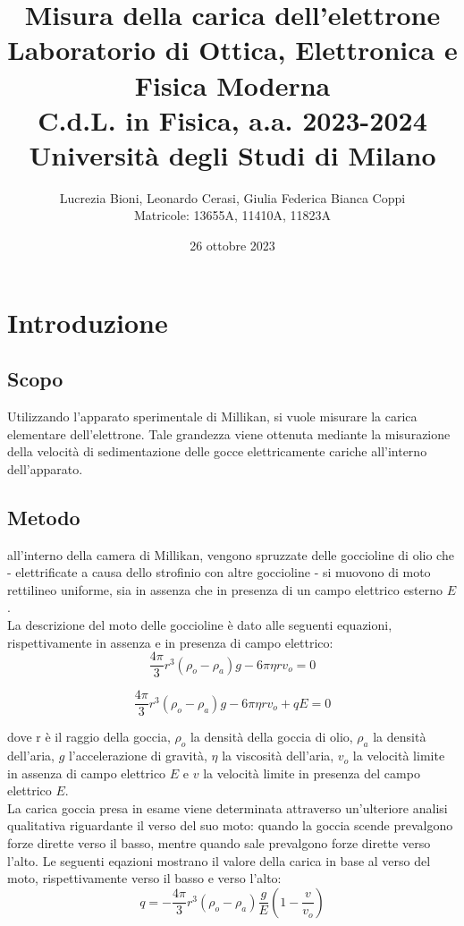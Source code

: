 \documentclass[]{article}
\title{%
    \Huge Misura della carica dell'elettrone \\
    \Large Laboratorio di Ottica, Elettronica e Fisica Moderna \\ C.d.L. in Fisica, a.a. 2023-2024 \\ Università degli Studi di Milano}
\author{\LARGE Lucrezia Bioni, Leonardo Cerasi, Giulia Federica Bianca Coppi \\ Matricole: 13655A, 11410A, 11823A}
\date{26 ottobre 2023}
\let\oldsection\section%
\renewcommand{\section}{%
	\renewcommand{\theequation}{\thesection.\arabic{equation}}%
	\oldsection}%
\let\oldsubsection\subsection%
\renewcommand{\subsection}{%
	\renewcommand{\theequation}{\thesubsection.\arabic{equation}}%
	\oldsubsection}%
\begin{document}
    \maketitle

    \section{Introduzione}
    \subsection{Scopo}
    Utilizzando l'apparato sperimentale di Millikan, si vuole misurare la carica elementare dell'elettrone. Tale grandezza viene ottenuta mediante la misurazione della velocità di sedimentazione delle gocce elettricamente cariche all'interno dell'apparato.

    \subsection{Metodo}
    all'interno della camera di Millikan, vengono spruzzate delle goccioline di olio che - elettrificate a causa dello strofinio con altre goccioline - si muovono di moto rettilineo uniforme, sia in assenza che in presenza di un campo elettrico esterno $E$. \\ La descrizione del moto delle goccioline è dato alle seguenti equazioni, rispettivamente in assenza e in presenza di campo elettrico: 
    \begin{equation}
        \label{moto1}
        \frac{4 \pi}{3} r^3 (\rho_o - \rho_a) g - 6 \pi \eta r v_o = 0
    \end{equation}
        
    \begin{equation}
        \label{moto2}
        \frac{4 \pi}{3} r^3 (\rho_o - \rho_a) g - 6 \pi \eta r v_o + qE= 0
    \end{equation}

    dove r è il raggio della goccia, $\rho_o $ la densità della goccia di olio, $ \rho_a$ la densità dell'aria, $g$ l'accelerazione di gravità, $\eta$ la viscosità dell'aria, $v_o$ la velocità limite in assenza di campo elettrico $E$ e $v$ la velocità limite in presenza del campo elettrico $E$.\\
    La carica goccia presa in esame viene determinata attraverso un'ulteriore analisi qualitativa riguardante il verso del suo moto: quando la goccia scende prevalgono forze dirette verso il basso, mentre quando sale prevalgono forze dirette verso l'alto. Le seguenti eqazioni mostrano il valore della carica in base al verso del moto, rispettivamente verso il basso e verso l'alto:
    \begin{equation}
        \label{carica1}
        q= - \frac{4 \pi}{3} r^3 (\rho_o - \rho_a) \frac{g}{E} \left( 1 - \frac{v}{v_o} \right)
    \end{equation}
        
\end{document}
